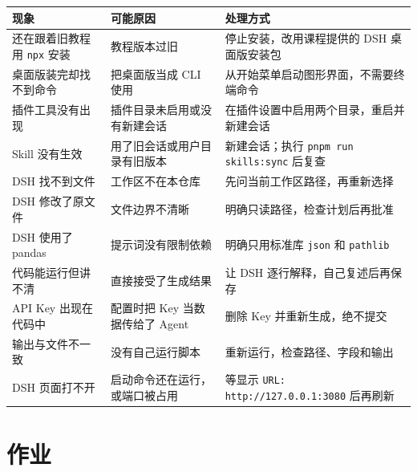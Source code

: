 \begin{longtable}[]{@{}
  >{\raggedright\arraybackslash}p{}
  >{\raggedright\arraybackslash}p{}
  >{\raggedright\arraybackslash}p{}@{}}
\toprule\noalign{}
\begin{minipage}[b]{\linewidth}\raggedright
现象
\end{minipage} & \begin{minipage}[b]{\linewidth}\raggedright
可能原因
\end{minipage} & \begin{minipage}[b]{\linewidth}\raggedright
处理方式
\end{minipage} \\
\midrule\noalign{}
\endhead
\bottomrule\noalign{}
\endlastfoot
还在跟着旧教程用 \passthrough{\lstinline!npx!} 安装 & 教程版本过旧 &
停止安装，改用课程提供的 DSH 桌面版安装包 \\
桌面版装完却找不到命令 & 把桌面版当成 CLI 使用 &
从开始菜单启动图形界面，不需要终端命令 \\
插件工具没有出现 & 插件目录未启用或没有新建会话 &
在插件设置中启用两个目录，重启并新建会话 \\
Skill 没有生效 & 用了旧会话或用户目录有旧版本 & 新建会话；执行
\passthrough{\lstinline!pnpm run skills:sync!} 后复查 \\
DSH 找不到文件 & 工作区不在本仓库 & 先问当前工作区路径，再重新选择 \\
DSH 修改了原文件 & 文件边界不清晰 & 明确只读路径，检查计划后再批准 \\
DSH 使用了 pandas & 提示词没有限制依赖 & 明确只用标准库
\passthrough{\lstinline!json!} 和 \passthrough{\lstinline!pathlib!} \\
代码能运行但讲不清 & 直接接受了生成结果 & 让 DSH
逐行解释，自己复述后再保存 \\
API Key 出现在代码中 & 配置时把 Key 当数据传给了 Agent & 删除 Key
并重新生成，绝不提交 \\
输出与文件不一致 & 没有自己运行脚本 & 重新运行，检查路径、字段和输出 \\
DSH 页面打不开 & 启动命令还在运行，或端口被占用 & 等显示
\passthrough{\lstinline!URL: http://127.0.0.1:3080!} 后再刷新 \\
\end{longtable}

\section{作业}\label{src-appendix-appendix4-assignment}

